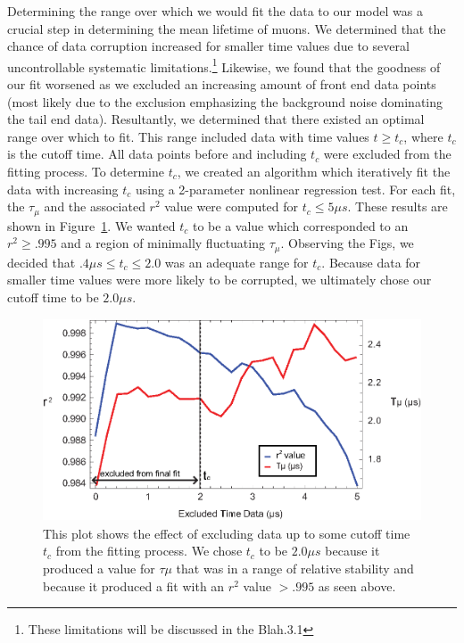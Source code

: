 Determining the range over which we would fit the data to our model
was a crucial step in determining the mean lifetime of muons.  We
determined that the chance of data corruption increased for smaller
time values due to several uncontrollable systematic
limitations.\footnote{These limitations will be discussed in the
Blah.3.1} Likewise, we found that the goodness of our fit worsened as
we excluded an increasing amount of front end data points (most likely
due to the exclusion emphasizing the background noise dominating the
tail end data).  Resultantly, we determined that there existed an
optimal range over which to fit.  This range included data with time
values $t \geq t_{c}$, where $t_{c}$ is the cutoff time.  All data
points before and including $t_{c}$ were excluded from the fitting
process.  To determine $t_{c}$, we created an algorithm which
iteratively fit the data with increasing $t_{c}$ using a 2-parameter
nonlinear regression test.  For each fit, the $\tau_{\mu}$ and the
associated $r^{2}$ value were computed for $t_{c}\leq 5\mu s$.  These
results are shown in Figure~\ref{fig:rsq}.  We wanted $t_{c}$ to be a
value which corresponded to an $r^{2} \geq .995$ and a region of
minimally fluctuating $\tau_{\mu}$.  Observing the Figs, we decided
that ${.4\mu s \leq t_{c}\leq 2.0}$ was an adequate range for $t_{c}$.
Because data for smaller time values were more likely to be corrupted,
we ultimately chose our cutoff time to be $2.0 \mu s$.


\begin{figure}[htbp]
\begin{center}
\includegraphics[height=60mm]{./figures/lifetime_fit_param.eps}
\caption{This plot shows the effect of excluding data up to some cutoff time $t_{c}$ from the fitting process.  We chose $t_{c}$ to be $2.0 \mu s$ because it produced a value for $\tau{\mu}$ that was in a range of relative stability and because it produced a fit with an $r^{2}$ value $> .995$ as seen above.}
\label{fig:rsq}
\end{center}
\end{figure}

